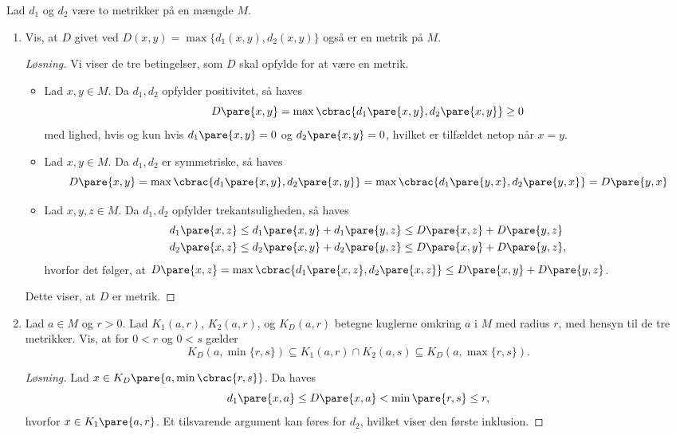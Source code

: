 \begin{opg}
Lad $d_1$ og $d_2$ være to metrikker på en
mængde $M$.  
\begin{enumerate}
\item
Vis, at $D$ givet ved $D(x,y)=\max\{d_1(x,y),d_2(x,y)\}$ også er en metrik på $M$.

\begin{proof}[Løsning]
Vi viser de tre betingelser, som $D$ skal opfylde for at være en metrik.
\begin{itemize}
    \item Lad $x,y\in M$. Da $d_1,d_2$ opfylder positivitet, så haves 
    $$ D\pare{x,y} = \max\cbrac{d_1\pare{x,y},d_2\pare{x,y}} \geq 0 $$
    med lighed, hvis og kun hvis $d_1\pare{x,y} = 0$ og $d_2\pare{x,y} = 0$, hvilket er tilfældet netop når $x = y$.
    
    \item Lad $x,y\in M$. Da $d_1,d_2$ er symmetriske, så haves
    $$ D\pare{x,y} = \max\cbrac{d_1\pare{x,y},d_2\pare{x,y}}
        = \max\cbrac{d_1\pare{y,x},d_2\pare{y,x}} = D\pare{y,x} $$
    
    \item Lad $x,y,z\in M$. Da $d_1,d_2$ opfylder trekantsuligheden, så haves
    \begin{align*}
        d_1\pare{x,z} &\leq d_1\pare{x,y} + d_1\pare{y,z}
            \leq D\pare{x,z} + D\pare{y,z} \\
        d_2\pare{x,z} &\leq d_2\pare{x,y} + d_2\pare{y,z}
            \leq D\pare{x,y} + D\pare{y,z},
    \end{align*}
    hvorfor det følger, at $D\pare{x,z} = \max\cbrac{d_1\pare{x,z},d_2\pare{x,z}} \leq D\pare{x,y} + D\pare{y,z}$.
\end{itemize}
Dette viser, at $D$ er metrik.
\end{proof}

\item Lad $a\in M$ og $r>0$. Lad $K_1(a,r)$, $K_2(a,r)$, og $K_D(a,r)$ betegne kuglerne omkring $a$ i $M$ med radius $r$, med hensyn til de tre metrikker. Vis, at for $0<r$ og $0<s$ gælder
$$ K_D(a,\min\{r,s\})\subseteq K_1(a,r)\cap K_2(a,s)  \subseteq K_D(a,\max\{r,s\}). $$

\begin{proof}[Løsning]
Lad $x\in K_D\pare{a,\min\cbrac{r,s}}$. Da haves
$$ d_1\pare{x,a} \leq D\pare{x,a} < \min\pare{r,s} \leq r, $$
hvorfor $x\in K_1\pare{a,r}$. Et tilsvarende argument kan føres for $d_2$, hvilket viser den første inklusion.


\end{proof}
\end{enumerate}
\end{opg}
